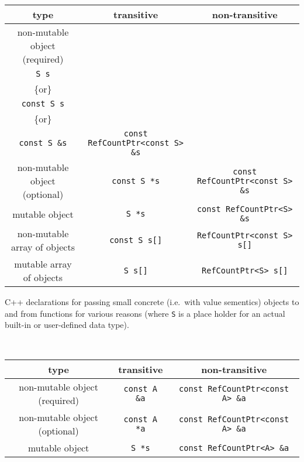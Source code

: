 \begin{table}
%
\begin{minipage}{\textwidth}
\begin{tabular}{|c|c|c|}
\hline
type
& transitive
& non-transitive \\
\hline
non-mutable object (required)
& \begin{minipage}{20ex}
    \begin{center}
    .\\
    \texttt{S s} \\
    \{or\} \\
    \texttt{const S s} \\
    \{or\} \\
    \texttt{const S \&s}
    \end{center}
  \end{minipage}
& \texttt{const RefCountPtr<const S> \&s} \\
\hline
non-mutable object (optional)
& \texttt{const S *s}
& \texttt{const RefCountPtr<const S> \&s} \\
\hline
mutable object
& \texttt{S *s}
& \texttt{const RefCountPtr<S> \&s} \\
\hline
non-mutable array of objects
& \texttt{const S s[]}
& \texttt{RefCountPtr<const S> s[]} \\
\hline
mutable array of objects
& \texttt{S s[]}
& \texttt{RefCountPtr<S> s[]} \\
\hline
\end{tabular}
\begin{center}
C++ declarations for passing small concrete (i.e.~with value
sementics) objects to and from functions for various reasons (where
\texttt{S} is a place holder for an actual built-in or user-defined
data type).
\end{center}
\end{minipage}
%
\\[5ex]
%
\begin{minipage}{\textwidth}
\begin{tabular}{|c|c|c|}
\hline
type
& transitive
& non-transitive \\
\hline
non-mutable object (required)
& \texttt{const A \&a}
& \texttt{const RefCountPtr<const A> \&a} \\
\hline
non-mutable object (optional)
& \texttt{const A *a}
& \texttt{const RefCountPtr<const A> \&a} \\
\hline
mutable object
& \texttt{S *s}
& \texttt{const RefCountPtr<A> \&a} \\

\end{tabular}
\end{minipage}
\end{table}
